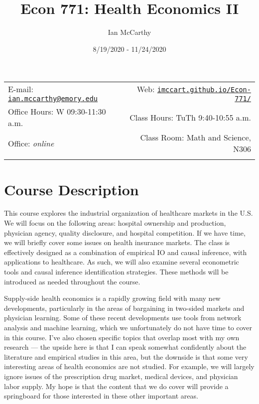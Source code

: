 \documentclass[11pt,]{article}
\title{Econ 771: Health Economics II}
\author{Ian McCarthy}
\date{8/19/2020 - 11/24/2020}
\begin{document}
  

		\maketitle
		
	
		\thispagestyle{firststyle}



	\noindent \begin{tabular*}{\textwidth}{ @{\extracolsep{\fill}} lr @{\extracolsep{\fill}}}


E-mail: \texttt{\href{mailto:ian.mccarthy@emory.edu}{\nolinkurl{ian.mccarthy@emory.edu}}} & Web: \href{http://imccart.github.io/Econ-771/}{\tt imccart.github.io/Econ-771/}\\
Office Hours: W 09:30-11:30 a.m.  &  Class Hours: TuTh 9:40-10:55 a.m.\\
Office: \emph{online}  & Class Room: Math and Science, N306\\
	&  \\
	\hline
	\end{tabular*}
	
\vspace{2mm}
	


\hypertarget{course-description}{%
\section{Course Description}\label{course-description}}

This course explores the industrial organization of healthcare markets
in the U.S. We will focus on the following areas: hospital ownership and
production, physician agency, quality disclosure, and hospital
competition. If we have time, we will briefly cover some issues on
health insurance markets. The class is effectively designed as a
combination of empirical IO and causal inference, with applications to
healthcare. As such, we will also examine several econometric tools and
causal inference identification strategies. These methods will be
introduced as needed throughout the course.

Supply-side health economics is a rapidly growing field with many new
developments, particularly in the areas of bargaining in two-sided
markets and physician learning. Some of these recent developments use
tools from network analysis and machine learning, which we unfortunately
do not have time to cover in this course. I've also chosen specific
topics that overlap most with my own research --- the upside here is
that I can speak somewhat confidently about the literature and empirical
studies in this area, but the downside is that some very interesting
areas of health economics are not studied. For example, we will largely
ignore issues of the prescription drug market, medical devices, and
physician labor supply. My hope is that the content that we do cover
will provide a springboard for those interested in these other important
areas.
\end{document}
